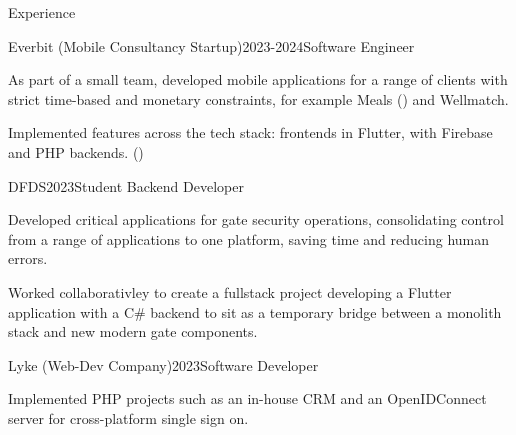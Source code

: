 \documentclass[
	a4paper,
	12pt,
]{resume}
\begin{document}
\begin{rSection}{Experience}
\begin{rWorksection}{Everbit (Mobile Consultancy Startup)}{2023-2024}{Software Engineer}
\item As part of a small team, developed mobile applications for a range of clients with strict time-based and monetary constraints, for example Meals () and Wellmatch.
\item Implemented features across the tech stack: frontends in Flutter, with Firebase and PHP backends. () 
\end{rWorksection}

\begin{rWorksection}{DFDS}{2023}{Student Backend Developer}
\item Developed critical applications for gate security operations, consolidating control from a range of applications to one platform, saving time and reducing human errors. 
\item Worked collaborativley to create a fullstack project developing a Flutter application with a C\# backend to sit as a temporary bridge between a monolith stack and new modern gate components.
\end{rWorksection}
	
\begin{rWorksection}{Lyke (Web-Dev Company)}{2023}{Software Developer}
\item Implemented PHP projects such as an in-house CRM and an OpenIDConnect server for cross-platform single sign on.
\end{rWorksection}


\end{rSection}

\newpage
\end{document}
